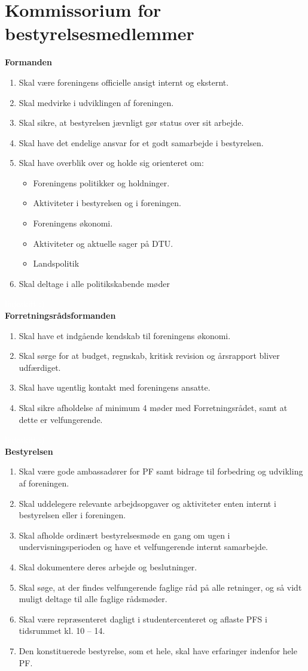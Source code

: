 \section{Kommissorium for bestyrelsesmedlemmer}
\textbf{Formanden}
\begin{enumerate}
\item  Skal være foreningens officielle ansigt internt og eksternt.
\item Skal medvirke i udviklingen af foreningen.
\item Skal sikre, at bestyrelsen jævnligt gør status over sit arbejde.
\item Skal have det endelige ansvar for et godt samarbejde i bestyrelsen.
\item Skal have overblik over og holde sig orienteret om:
\begin{itemize}
\item Foreningens politikker og holdninger.
\item Aktiviteter i bestyrelsen og i foreningen.
\item Foreningens økonomi.
\item Aktiviteter og aktuelle sager på DTU.
\item Landspolitik
\end{itemize}
\item Skal deltage i alle politikskabende møder
\end{enumerate}
\textcolor{white}{linjeskift :)}\\
\textbf{Forretningsrådsformanden}
\begin{enumerate}
\item Skal have et indgående kendskab til foreningens økonomi.
\item Skal sørge for at budget, regnskab, kritisk revision og årsrapport bliver udfærdiget.
\item Skal have ugentlig kontakt med foreningens ansatte.
\item Skal sikre afholdelse af minimum 4 møder med Forretningsrådet, samt at dette er velfungerende.
\end{enumerate}
\textcolor{white}{linjeskift :)}\\
\textbf{Bestyrelsen}
\begin{enumerate}
\item Skal være gode ambassadører for PF samt bidrage til forbedring og udvikling af foreningen.
\item Skal uddelegere relevante arbejdsopgaver og aktiviteter enten internt i bestyrelsen eller i foreningen.
\item Skal afholde ordinært bestyrelsesmøde en gang om ugen i undervisningsperioden og have et velfungerende internt samarbejde.
\item Skal dokumentere deres arbejde og beslutninger.
\item Skal søge, at der findes velfungerende faglige råd på alle retninger, og så vidt muligt deltage til alle faglige rådsmøder.
\item Skal være repræsenteret dagligt i studentercenteret og aflaste PFS i tidsrummet kl. 10 – 14.
\item Den konstituerede bestyrelse, som et hele, skal have erfaringer indenfor hele PF.
\end{enumerate}
